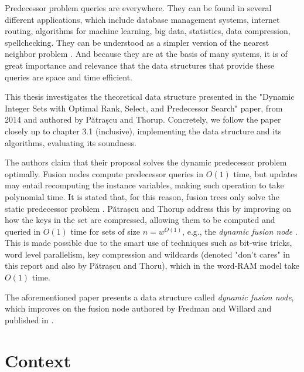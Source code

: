 
Predecessor problem queries are everywhere. They can be found in several different applications, which include database management systems, internet routing, algorithms for machine learning, big data, statistics, data compression, spellchecking. They can be understood as a simpler version of the nearest neighbor problem \cite{bille2020massive}. And because they are at the basis of many systems, it is of great importance and relevance that the data structures that provide these queries are space and time efficient.

This thesis investigates the theoretical data structure presented in the "Dynamic Integer Sets with Optimal Rank, Select, and Predecessor Search" paper, from 2014 and authored by Pătrașcu and Thorup. Concretely, we follow the paper closely up to chapter 3.1 (inclusive), implementing the data structure and its algorithms, evaluating its soundness.

The authors claim that their proposal solves the dynamic predecessor problem optimally.
Fusion nodes compute predecessor queries in $O(1)$ time, but updates may entail recomputing the instance variables, making such operation to take polynomial time.
It is stated that, for this reason, fusion trees only solve the static predecessor problem \cite{nelsonjelanilec2}.
Pătrașcu and Thorup address this by improving on how the keys in the set are compressed, allowing them to be computed and queried in $O(1)$ time for sets of size $n = w^{O(1)}$, e.g., the \textit{dynamic fusion node} \cite{patrascu2014dynamic}.
This is made possible due to the smart use of techniques such as bit-wise tricks, word level parallelism, key compression and wildcards (denoted "don't cares" in this report and also by Pătrașcu and Thoru), which in the word-RAM model take $O(1)$ time.



The aforementioned paper presents a data structure called \textit{dynamic fusion node}, which improves on the fusion node authored by Fredman and Willard and published in \cite{fredman1993surpassing}.



\section{Context}






